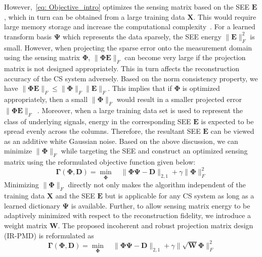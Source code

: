 However,~\eqref{eq: Objective_intro} optimizes the sensing matrix based on the SEE $\bm{E}$, which in turn can be obtained from a large training data $\bm{X}$. This would require large memory storage and increase the computational complexity~\cite{HONG_robust}. For a learned transform basis $\bm{\Psi}$ which represents the data sparsely, the SEE energy $\|\bm{E}\|_{F}^{2}$ is small. However, when projecting the sparse error onto the measurement domain using the sensing matrix $\bm{\Phi}$, $\|\bm{\Phi}\bm{E}\|_{F}$ can become very large if the projection matrix is not designed appropriately. This in turn affects the reconstruction accuracy of the CS system adversely. Based on the norm consistency property, we have $ \|\bm{\Phi}\bm{E}\|_{F} \leq \|\bm{\Phi}\|_{F}\|\bm{E}\|_{F}$. This implies that if $\bm{\Phi}$ is optimized appropriately, then a small $\|\bm{\Phi}\|_{F}$ would result in a smaller projected error $\|\bm{\Phi}\bm{E}\|_{F}$~\cite{HONG_robust}. Moreover, when a large training data set is used to represent the class of underlying signals, energy in the corresponding SEE $\bm{E}$ is expected to be spread evenly across the columns. Therefore, the resultant SEE $\bm{E}$ can be viewed as an additive white Gaussian noise.
Based on the above discussion, we can minimize $\|\bm{\Phi}\|_{F}$ while targeting the SEE and construct an optimized sensing matrix using the reformulated objective function given below:
%
\begin{equation}
    \label{eq: IR-PMD_objective}
   \bm{\Gamma}(\bm{\Phi}, \bm{D}) = \underset{\bm{\Phi}}{\min}\quad \|\bm{\Phi}\bm{\Psi}-\bm{D}\|_{2,1} + \gamma \| \bm{\Phi} \|_{F}^{2}
\end{equation}
%
Minimizing $\|\bm{\Phi}\|_{F}$ directly not only makes the algorithm independent of the training data $\bm{X}$ and the SEE $\bm{E}$ but is applicable for any CS system as long as a learned dictionary $\bm{\Psi}$ is available. Further, to allow sensing matrix energy to be adaptively minimized with respect to the reconstruction fidelity, we introduce a weight matrix $\bm{W}$. The proposed incoherent and robust projection matrix design (IR-PMD) is reformulated as 
\begin{equation}
    \label{eq: IR-pmd_final_obj}
    \bm{\Gamma}(\bm{\Phi}, \bm{D}) = \underset{\bm{\Phi}}{\min}\quad \|\bm{\Phi}\bm{\Psi}-\bm{D}\|_{2,1} + \gamma\|\sqrt{\bm{W}}\bm{\Phi}\|_{F}^{2}
\end{equation}
